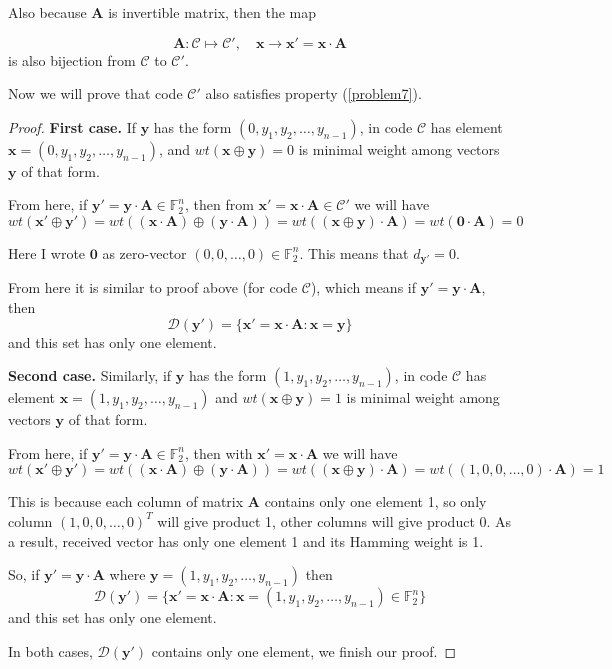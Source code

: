 \documentclass{article}
\newcommand{\FF}{\mathbb{F}}
\begin{document}
Also because $\bm{A}$ is invertible matrix, then the map

\begin{equation}
    \bm{A}: \mathcal{C} \mapsto \mathcal{C}', \quad \bm{x} \to \bm{x}' = \bm{x} \cdot \bm{A}
\end{equation}
is also bijection from $\mathcal{C}$ to $\mathcal{C}'$.



Now we will prove that code $\mathcal{C}'$ also satisfies property (\ref{problem7}).

\begin{proof}
    \textbf{First case.} If $\bm{y}$ has the form $(0, y_1, y_2, \ldots, y_{n-1})$, in code $\mathcal{C}$ has element $\bm{x} = (0, y_1, y_2, \ldots, y_{n-1})$, and $wt(\bm{x} \oplus \bm{y}) = 0$ is minimal weight among vectors $\bm{y}$ of that form.

    From here, if $\bm{y}' = \bm{y} \cdot \bm{A} \in \FF_2^n$, then from $\bm{x}' = \bm{x} \cdot \bm{A} \in \mathcal{C}'$ we will have \[ wt(\bm{x}' \oplus \bm{y}') = wt((\bm{x} \cdot \bm{A}) \oplus (\bm{y} \cdot \bm{A})) = wt((\bm{x} \oplus \bm{y}) \cdot \bm{A}) = wt(\bm{0} \cdot \bm{A}) = 0 \]

    Here I wrote $\bm{0}$ as zero-vector $(0, 0, \ldots, 0) \in \FF_2^n$. This means that $d_{\bm{y}'} = 0$.

    From here it is similar to proof above (for code $\mathcal{C}$), which means if $\bm{y}' = \bm{y} \cdot \bm{A}$, then \[ \mathcal{D}(\bm{y}') = \{ \bm{x}' = \bm{x} \cdot \bm{A}: \bm{x} = \bm{y} \} \] and this set has only one element.

    \textbf{Second case.} Similarly, if $\bm{y}$ has the form $(1, y_1, y_2, \ldots, y_{n-1})$, in code $\mathcal{C}$ has element $\bm{x} = (1, y_1, y_2, \ldots, y_{n-1})$ and $wt(\bm{x} \oplus \bm{y}) = 1$ is minimal weight among vectors $\bm{y}$ of that form.

    From here, if $\bm{y}' = \bm{y} \cdot \bm{A} \in \FF_2^n$, then with $\bm{x}' = \bm{x} \cdot \bm{A}$ we will have \[ wt(\bm{x}' \oplus \bm{y}') = wt((\bm{x} \cdot \bm{A}) \oplus (\bm{y} \cdot \bm{A})) = wt((\bm{x} \oplus \bm{y}) \cdot \bm{A}) = wt((1, 0, 0, \ldots, 0) \cdot \bm{A}) = 1 \]

    This is because each column of matrix $\bm{A}$ contains only one element 1, so only column $(1, 0, 0, \ldots, 0)^T$ will give product 1, other columns will give product 0. As a result, received vector has only one element 1 and its Hamming weight is 1.

    So, if $\bm{y}' = \bm{y} \cdot \bm{A}$ where $\bm{y} = (1, y_1, y_2, \ldots, y_{n-1})$ then \[ \mathcal{D}(\bm{y}') = \{ \bm{x}' = \bm{x} \cdot \bm{A}: \bm{x} = (1, y_1, y_2, \ldots, y_{n-1}) \in \FF_2^n \} \] and this set has only one element.

    In both cases, $\mathcal{D}(\bm{y}')$ contains only one element, we finish our proof.
\end{proof}
\end{document}
